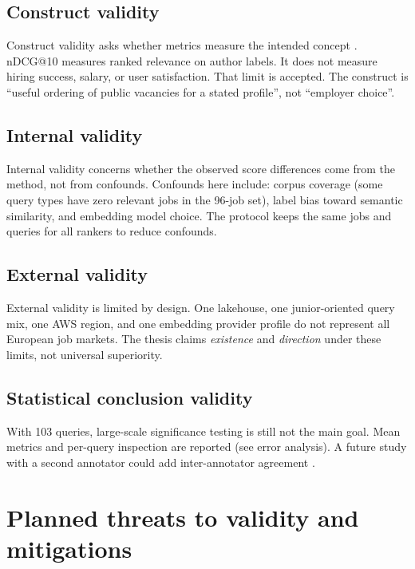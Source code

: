 \subsection{Construct validity}

Construct validity asks whether metrics measure the intended concept . nDCG@10 measures ranked relevance on author labels. It does not measure hiring success, salary, or user satisfaction. That limit is accepted. The construct is ``useful ordering of public vacancies for a stated profile'', not ``employer choice''.

\subsection{Internal validity}

Internal validity concerns whether the observed score differences come from the method, not from confounds. Confounds here include: corpus coverage (some query types have zero relevant jobs in the 96-job set), label bias toward semantic similarity, and embedding model choice. The protocol keeps the same jobs and queries for all rankers to reduce confounds.

\subsection{External validity}

External validity is limited by design. One lakehouse, one junior-oriented query mix, one AWS region, and one embedding provider profile do not represent all European job markets. The thesis claims \emph{existence} and \emph{direction} under these limits, not universal superiority.

\subsection{Statistical conclusion validity}

With 103 queries, large-scale significance testing is still not the main goal. Mean metrics and per-query inspection are reported (see error analysis). A future study with a second annotator could add inter-annotator agreement .

\section{Planned threats to validity and mitigations}
\label{sec:threats-planned}

